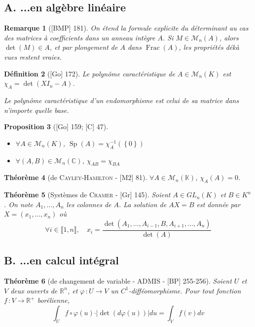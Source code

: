 \documentclass[10pt, a4paper, parskip=full, twoside, twocolumn]{report}
\newtheorem{definition}{Définition}
\newtheorem{theorem}[definition]{Théorème}
\newtheorem{proposition}[definition]{Proposition}
\newtheorem{remark}[definition]{Remarque}
\newcommand{\IK}{\mathbb{K}}
\newcommand{\IC}{\mathbb{C}}
\newcommand{\IR}{\mathbb{R}}
\DeclareMathOperator{\Frac}{Frac}
\DeclareMathOperator{\Sp}{Sp}
\begin{document}
\subsection*{A. ...en algèbre linéaire}

\begin{remark}[\textnormal{[BMP] 181}]
	On étend la formule explicite du déterminant au cas des matrices à coefficients dans un anneau intègre $A$.
	Si $M\in \mathcal{M}_n(A)$, alors $\det(M)\in A$, et par plongement de $A$ dans $\Frac(A)$, les propriétés dékà vues restent vraies.
\end{remark}

\begin{definition}[\textnormal{[Go] 172}]
	Le \emph{polynôme caractéristique de $A\in\mathcal{M}_n(K)$} est $\chi_A = \det(XI_n - A)$.

	Le \emph{polynôme caractéristique d'un endomorphisme} est celui de sa matrice dans n'importe quelle base.
\end{definition}

\begin{proposition}[\textnormal{[Go] 159; [C] 47}]
	\begin{itemize}
		\item $\forall A\in\mathcal{M}_n(K)$, $\Sp(A) = \chi^{-1}_A(\left\{0\right\})$
		\item $\forall (A,B)\in\mathcal{M}_n(\IC)$, $\chi_{AB} = \chi_{BA}$
	\end{itemize}
\end{proposition}

\begin{theorem}[de \textsc{Cayley-Hamilton} - \textnormal{[M2] 81}]
	$\forall A\in\mathcal{M}_n(\IK)$, $\chi_A(A)=0$.
\end{theorem}

\begin{theorem}[Systèmes de \textsc{Cramer} - \textnormal{[Gr] 145}]
	Soient $A\in GL_n(K)$ et $B\in K^n$. On note $A_1,\dots, A_n$
	les colonnes de $A$. La solution de $AX=B$ est donnée par $X=(x_1,\dots, x_n)$ où
	$$\forall i\in \llbracket 1,n\rrbracket,\quad x_i = \frac{\det(A_1,\dots,A_{i-1},B,A_{i+1},\dots, A_n)}{\det(A)}$$
\end{theorem}

\subsection*{B. ...en calcul intégral}
\begin{theorem}[de changement de variable - ADMIS - \textnormal{[BP] 255-256}]
	Soient $U$ et $V$ deux ouverts de $\IR^n$, et 
	$\varphi\,\colon U\to V$ un $C^1$-difféomorphisme. Pour tout fonction $f\,\colon V\to \IR^+$ borélienne,
	$$\int_{U} f\circ \varphi(u)\cdot \vert \det(d\varphi(u))\vert du = \int_{V}f(v)dv$$
\end{theorem}
\end{document}
